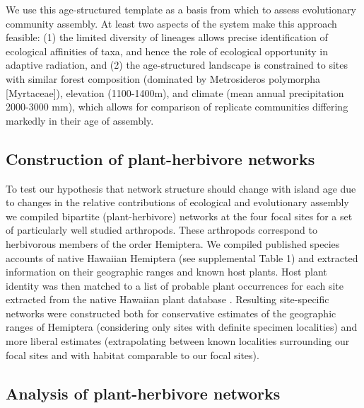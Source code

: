 \documentclass[12pt]{article}
\begin{document}
We use this age-structured template as a basis from which to assess
evolutionary community assembly. At least two aspects of the system
make this approach feasible: (1) the limited diversity of lineages
allows precise identification of ecological affinities of taxa, and
hence the role of ecological opportunity in adaptive radiation, and
(2) the age-structured landscape is constrained to sites with similar
forest composition (dominated by Metrosideros polymorpha [Myrtaceae]),
elevation (1100-1400m), and climate (mean annual precipitation
2000-3000 mm), which allows for comparison of replicate communities
differing markedly in their age of assembly.

\subsection*{Construction of plant-herbivore networks}

To test our hypothesis that network structure should change with
island age due to changes in the relative contributions of ecological
and evolutionary assembly we compiled bipartite (plant-herbivore)
networks at the four focal sites for a set of particularly well
studied arthropods. These arthropods correspond to herbivorous members
of the order Hemiptera. We compiled published species accounts of
native Hawaiian Hemiptera (see supplemental Table 1) and extracted
information on their geographic ranges and known host plants. Host
plant identity was then matched to a list of probable plant occurrences
for each site extracted from the native Hawaiian plant database
\citep{price2013}. Resulting site-specific networks were constructed
both for conservative estimates of the geographic ranges of Hemiptera
(considering only sites with definite specimen localities) and more
liberal estimates (extrapolating between known localities surrounding
our focal sites and with habitat comparable to our focal sites).

\subsection*{Analysis of plant-herbivore networks}
\end{document}
